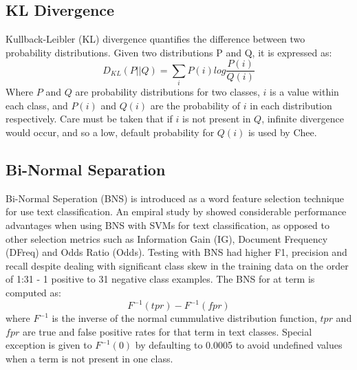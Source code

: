 \documentclass[twoside,11pt]{article}
\begin{document}
\subsection{KL Divergence}
Kullback-Leibler (KL) divergence quantifies the difference between two probability distributions. Given two distributions P and Q, it is expressed as:
\[
  D_{KL}(P||Q) = \sum_{i}P(i)log\frac{P(i)}{Q(i)}
\]
Where $P$ and $Q$ are probability distributions for two classes, $i$ is a value within each class, and $P(i)$ and $Q(i)$ are the probability of $i$ in each distribution respectively. Care must be taken that if $i$ is not present in $Q$, infinite divergence would occur, and so a low, default probability for $Q(i)$ is used by Chee.

\subsection{Bi-Normal Separation}
Bi-Normal Seperation (BNS) is introduced as a word feature selection technique for use text classification. An empiral study by \citep{Forman} showed considerable performance advantages when using BNS with SVMs for text classification, as opposed to other selection metrics such as Information Gain (IG), Document Frequency (DFreq) and Odds Ratio (Odds). Testing with BNS had higher F1, precision and recall despite dealing with significant class skew in the training data on the order of 1:31 - 1 positive to 31 negative class examples. The BNS for at term is computed as:
\[
  F^{-1}(tpr) - F^{-1}(fpr)
\]
where $F^{-1}$ is the inverse of the normal cummulative distribution function, $tpr$ and $fpr$ are true and false positive rates for that term in text classes. Special exception is given to $F^{-1}(0)$ by defaulting to 0.0005 to avoid undefined values when a term is not present in one class.
\end{document}
